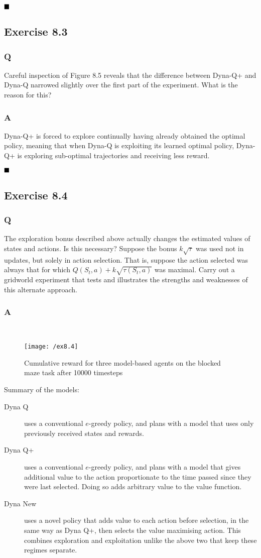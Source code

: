 $
\hfill \blacksquare
$

\subsection{Exercise 8.3}
\subsubsection{Q}
Careful inspection of Figure 8.5 reveals that the difference between Dyna-Q+ and Dyna-Q narrowed slightly over the first part of the experiment. What is the reason for this?
\subsubsection{A}
Dyna-Q+ is forced to explore continually having already obtained the optimal policy, meaning that when Dyna-Q is exploiting its learned optimal policy, Dyna-Q+ is exploring sub-optimal trajectories and receiving less reward.

$
\hfill \blacksquare
$

\subsection{Exercise 8.4}
\subsubsection{Q}
The exploration bonus described above actually changes the estimated values of states and actions. Is this necessary? Suppose the bonus $k\sqrt{\tau}$ was used not in updates, but solely in action selection. That is, suppose the action selected was always that for which $Q(S_t, a) + k\sqrt{\tau(S_t, a)}$ was maximal. Carry out a gridworld experiment that tests and illustrates the strengths and weaknesses of this alternate approach.
\subsubsection{A}
\ProgrammingExercise \\
\begin{figure}[h!]
	\centering
	\texttt{[image: /ex8.4]}
	\caption{Cumulative reward for three model-based agents on the blocked maze task after 10000 timesteps}
	\label{fig: 8.4}
\end{figure}
Summary of the models:
\begin{description}
\item[Dyna Q] uses a conventional $e$-greedy policy, and plans with a model that uses only previously received states and rewards. 
\item[Dyna Q+] uses a conventional $e$-greedy policy, and plans with a model that gives additional value to the action proportionate to the time passed since they were last selected. Doing so adds arbitrary value to the value function.
\item[Dyna New] uses a novel policy that adds value to each action before selection, in the same way as Dyna Q+, then selects the value maximising action. This combines exploration and exploitation unlike the above two that keep these regimes separate.
\end{description}

